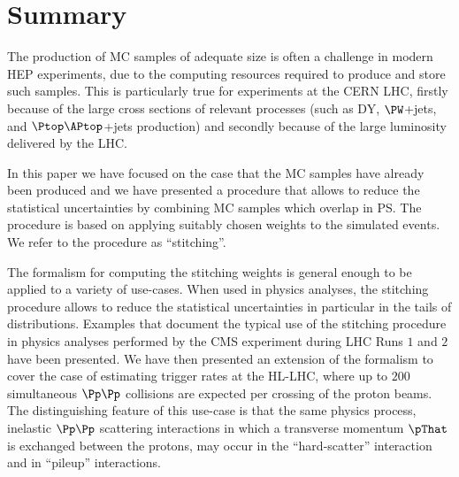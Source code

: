 \section{Summary}
\label{sec:summary}

The production of MC samples of adequate size is often a challenge in modern HEP experiments,
due to the computing resources required to produce and store such samples.
This is particularly true for experiments at the CERN LHC,
firstly because of the large cross sections of relevant processes (such as DY, $\PW$+jets, and $\Ptop\APtop$+jets production)
and secondly because of the large luminosity delivered by the LHC.

In this paper we have focused on the case that the MC samples have already been produced
and we have presented a procedure that allows to reduce the statistical uncertainties 
by combining MC samples which overlap in PS.
The procedure is based on applying suitably chosen weights to the simulated events.
We refer to the procedure as ``stitching''.

The formalism for computing the stitching weights is general enough to be applied to a variety of use-cases.
When used in physics analyses, the stitching procedure allows to reduce the statistical uncertainties in particular in the tails of distributions.
Examples that document the typical use of the stitching procedure in physics analyses performed by the CMS experiment during LHC Runs $1$ and $2$ have been presented.
We have then presented an extension of the formalism to cover the case of estimating trigger rates at the HL-LHC,
where up to $200$ simultaneous $\Pp\Pp$ collisions are expected per crossing of the proton beams.
The distinguishing feature of this use-case is that the same physics process, 
inelastic $\Pp\Pp$ scattering interactions in which a transverse momentum $\pThat$ is exchanged between the protons,
may occur in the ``hard-scatter'' interaction and in ``pileup'' interactions.
